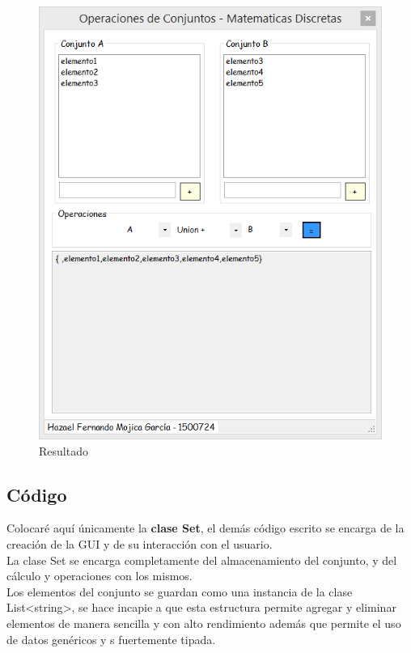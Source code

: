 \begin{figure}[h]
\centering
    \includegraphics[angle = 0]{img/4.png}
    \caption{Resultado}
	\label{img:4}
\end{figure}

\newpage

\subsection{Código}

Colocaré aquí únicamente la \textbf{clase Set}, el demás código escrito se encarga de la creación de la GUI y de su interacción con el usuario.\\

La clase Set se encarga completamente del almacenamiento del conjunto, y del  cálculo y operaciones con los mismos.\\

Los elementos del conjunto se guardan como una instancia de la clase List<string>, se hace incapie a que esta estructura permite agregar y eliminar elementos de manera sencilla y con alto rendimiento además que permite el uso de datos genéricos y s fuertemente tipada.\\

